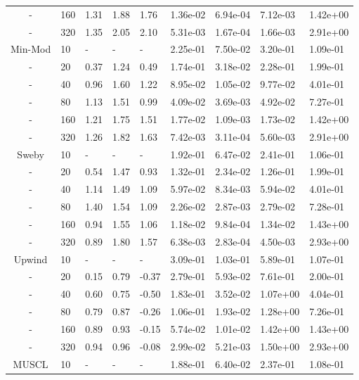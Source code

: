 \begin{table}[h]
{\begin{tabular}{cllllllll}
     - & 160 & 1.31 & 1.88 & 1.76 & 1.36e-02 & 6.94e-04 & 7.12e-03 & 1.42e+00 \\ 
     - & 320 & 1.35 & 2.05 & 2.10 & 5.31e-03 & 1.67e-04 & 1.66e-03 & 2.91e+00 \\ 
   \hline
        Min-Mod &  10 & - & - & - & 2.25e-01 & 7.50e-02 & 3.20e-01 & 1.09e-01 \\ 
        - &  20 & 0.37 & 1.24 & 0.49 & 1.74e-01 & 3.18e-02 & 2.28e-01 & 1.99e-01 \\ 
        - &  40 & 0.96 & 1.60 & 1.22 & 8.95e-02 & 1.05e-02 & 9.77e-02 & 4.01e-01 \\ 
        - &  80 & 1.13 & 1.51 & 0.99 & 4.09e-02 & 3.69e-03 & 4.92e-02 & 7.27e-01 \\ 
        - & 160 & 1.21 & 1.75 & 1.51 & 1.77e-02 & 1.09e-03 & 1.73e-02 & 1.42e+00 \\ 
        - & 320 & 1.26 & 1.82 & 1.63 & 7.42e-03 & 3.11e-04 & 5.60e-03 & 2.91e+00 \\ 
   \hline
          Sweby &  10 & - & - & - & 1.92e-01 & 6.47e-02 & 2.41e-01 & 1.06e-01 \\
          - &  20 & 0.54 & 1.47 & 0.93 & 1.32e-01 & 2.34e-02 & 1.26e-01 & 1.99e-01 \\
          - &  40 & 1.14 & 1.49 & 1.09 & 5.97e-02 & 8.34e-03 & 5.94e-02 & 4.01e-01 \\
          - &  80 & 1.40 & 1.54 & 1.09 & 2.26e-02 & 2.87e-03 & 2.79e-02 & 7.28e-01 \\
          - & 160 & 0.94 & 1.55 & 1.06 & 1.18e-02 & 9.84e-04 & 1.34e-02 & 1.43e+00 \\
          - & 320 & 0.89 & 1.80 & 1.57 & 6.38e-03 & 2.83e-04 & 4.50e-03 & 2.93e+00 \\
   \hline
         Upwind &  10 & - & - & - & 3.09e-01 & 1.03e-01 & 5.89e-01 & 1.07e-01 \\ 
         - &  20 & 0.15 & 0.79 & -0.37& 2.79e-01 & 5.93e-02 & 7.61e-01 & 2.00e-01 \\ 
         - &  40 & 0.60 & 0.75 & -0.50& 1.83e-01 & 3.52e-02 & 1.07e+00 & 4.04e-01 \\ 
         - &  80 & 0.79 & 0.87 & -0.26& 1.06e-01 & 1.93e-02 & 1.28e+00 & 7.26e-01 \\ 
         - & 160 & 0.89 & 0.93 & -0.15& 5.74e-02 & 1.01e-02 & 1.42e+00 & 1.43e+00 \\ 
         - & 320 & 0.94 & 0.96 & -0.08& 2.99e-02 & 5.21e-03 & 1.50e+00 & 2.93e+00 \\ 
   \hline
          MUSCL &  10 & - & - & - & 1.88e-01 & 6.40e-02 & 2.37e-01 & 1.08e-01 \\

\end{tabular}}
\end{table}
